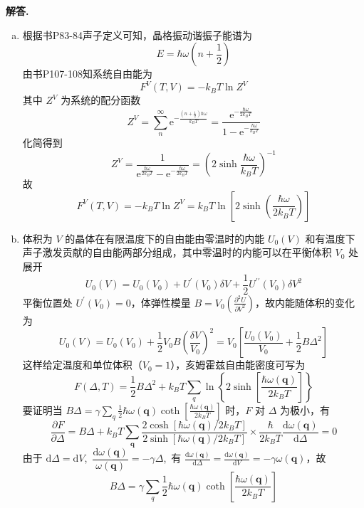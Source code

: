 \documentclass[11pt]{ctexart}
\newenvironment{solution}{\par\noindent\textbf{解答. }}{\par}
\begin{document}
\begin{solution}
    \begin{enumerate}[(a)]
        \item 根据书P83-84声子定义可知，晶格振动谐振子能谱为 
              $$E = \hbar\omega\left(n + \dfrac{1}{2}\right)$$
              由书P107-108知系统自由能为
              $$F^V(T,V) = -k_BT\ln{Z^V}$$
              其中 $Z^V$ 为系统的配分函数
              $$Z^V = \sum_n^{\infty}\text{e}^{-\frac{(n+\frac{1}{2})\hbar\omega}{k_BT}} = \frac{\text{e}^{-\frac{\hbar\omega}{2k_BT}}}{1 - \text{e}^{-\frac{\hbar\omega}{k_BT}}}$$
              化简得到
              $$Z^V = \frac{1}{\text{e}^{\frac{\hbar\omega}{2k_BT}} - \text{e}^{-\frac{\hbar\omega}{2k_BT}}} = \left(2\sinh{\frac{\hbar\omega}{k_BT}}\right)^{-1}$$
              故
              $$F^V(T,V) = -k_BT\ln{Z^V} = k_BT\ln{\left[2\sinh{\left(\dfrac{\hbar\omega}{2k_BT}\right)}\right]}$$
        \item 体积为 $V$ 的晶体在有限温度下的自由能由零温时的内能 $U_0(V)$ 和有温度下声子激发贡献的自由能两部分组成，其中零温时的内能可以在平衡体积 $V_0$ 处展开
              $$U_0(V) = U_0(V_0) + U^\prime(V_0)\delta V + \frac{1}{2}U^{\prime\prime}(V_0)\delta V^2$$
              平衡位置处 $U^\prime(V_0) = 0$，体弹性模量 $\displaystyle B = V_0\left(\frac{\partial^2 U}{\partial V^2}\right)$，故内能随体积的变化为
              $$U_0(V) = U_0(V_0) + \frac{1}{2}V_0B\left(\frac{\delta V}{V_0}\right)^2 = V_0\left[\frac{U_0(V_0)}{V_0} + \frac{1}{2}B\Delta^2\right]$$
              这样给定温度和单位体积（$V_0 = 1$），亥姆霍兹自由能密度可写为
              $$\displaystyle F(\Delta,T) = \frac{1}{2}B\Delta^2 + k_BT\sum_{q}\ln{\left\{2\sinh{\left[\frac{\hbar\omega(\mathbf{q})}{2k_BT}\right]}\right\}}$$
              要证明当 $\displaystyle B\Delta = \gamma\sum_{q}\frac{1}{2}\hbar\omega(\mathbf{q})\coth{\left[\frac{\hbar\omega(\mathbf{q})}{2k_BT}\right]}$ 时，$F$ 对 $\Delta$ 为极小，有
              $$\frac{\partial F}{\partial \Delta} = B\Delta + k_BT\sum_{\mathbf{q}}\frac{2\cosh{[\hbar\omega(\mathbf{q})/2k_BT]}}{2\sinh{[\hbar\omega(\mathbf{q})/2k_BT]}}\times\frac{\hbar}{2k_BT}\frac{\text{d}\omega(\mathbf{q})}{\text{d}\Delta} = 0$$
              由于 $\text{d}\Delta = \text{d}V$,\ $\dfrac{\text{d}\omega(\mathbf{q})}{\omega(\mathbf{q})} = -\gamma\Delta$,\ 有 $\displaystyle\frac{\text{d}\omega(\mathbf{q})}{\text{d}\Delta} = \frac{\text{d}\omega(\mathbf{q})}{\text{d}V} = -\gamma\omega(\mathbf{q})$，故
              $$B\Delta = \gamma\sum_{q}\frac{1}{2}\hbar\omega(\mathbf{q})\coth{\left[\frac{\hbar\omega(\mathbf{q})}{2k_BT}\right]}$$

\end{enumerate}
\end{solution}
\end{document}
